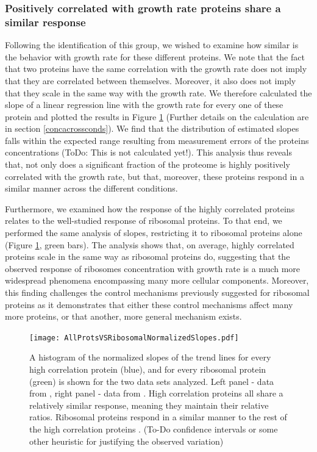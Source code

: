 \documentclass[notitlepage]{article}
\begin{document}
\subsubsection{Positively correlated with growth rate proteins share a similar response}
\label{propchange}
Following the identification of this group, we wished to examine how similar is the behavior with growth rate for these different proteins.
We note that the fact that two proteins have the same correlation with the growth rate does not imply that they are correlated between themselves.
Moreover, it also does not imply that they scale in the same way with the growth rate.
We therefore calculated the slope of a linear regression line with the growth rate for every one of these protein and plotted the results in Figure \ref{fig:globalfit} (Further details on the calculation are in section \ref{concacrossconds}).
We find that the distribution of estimated slopes falls within the expected range resulting from measurement errors of the proteins concentrations (ToDo: This is not calculated yet!).
This analysis thus reveals that, not only does a significant fraction of the proteome is highly positively correlated with the growth rate, but that, moreover, these proteins respond in a similar manner across the different conditions.

Furthermore, we examined how the response of the highly correlated proteins relates to the well-studied response of ribosomal proteins.
To that end, we performed the same analysis of slopes, restricting it to ribosomal proteins alone (Figure \ref{fig:globalfit}, green bars).
The analysis shows that, on average, highly correlated proteins scale in the same way as ribosomal proteins do, suggesting that the observed response of ribosomes concentration with growth rate is a much more widespread phenomena encompassing many more cellular components.
Moreover, this finding challenges the control mechanisms previously suggested for ribosomal proteins as it demonstrates that either these control mechanisms affect many more proteins, or that another, more general mechanism exists.

\begin{figure}[h]
\centering
\texttt{[image: AllProtsVSRibosomalNormalizedSlopes.pdf]}
\caption{
    A histogram of the normalized slopes of the trend lines for every high correlation protein (blue), and for every ribosomal protein (green) is shown for the two data sets analyzed.
    Left panel - data from \parencite{Valgepea2013}, right panel - data from \parencite{Heinemann2014}.
    High correlation proteins all share a relatively similar response, meaning they maintain their relative ratios.
    Ribosomal proteins respond in a similar manner to the rest of the high correlation proteins .
    (To-Do confidence intervals or some other heuristic for justifying the observed variation)
}
\label{fig:globalfit}
\end{figure}
\end{document}
